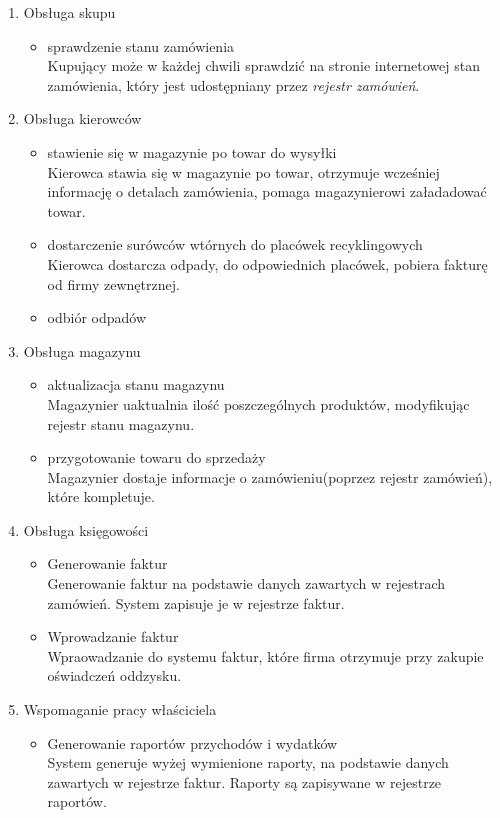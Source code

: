 \begin{enumerate}
	\item Obsługa skupu
		\begin{itemize}
			\item sprawdzenie stanu zamówienia \\ 
			Kupujący może w każdej chwili sprawdzić na stronie internetowej stan zamówienia, który jest udostępniany przez \emph{rejestr zamówień}.
		\end{itemize}
	\item Obsługa kierowców 
		\begin{itemize}
		\item stawienie się w magazynie po towar do wysyłki \\ 
		Kierowca stawia się w magazynie po towar, otrzymuje wcześniej informację o detalach zamówienia, pomaga magazynierowi załadadować towar.
		\item dostarczenie surówców wtórnych do placówek recyklingowych \\ 
		Kierowca dostarcza odpady, do odpowiednich placówek, pobiera fakturę od firmy zewnętrznej.
		\item odbiór odpadów
		\end{itemize}
	\item Obsługa magazynu
		\begin{itemize}
		\item aktualizacja stanu magazynu \\
	 	Magazynier uaktualnia ilość poszczególnych produktów, modyfikując rejestr stanu magazynu.
	 	\item przygotowanie towaru do sprzedaży \\
	 	Magazynier dostaje informacje o zamówieniu(poprzez rejestr zamówień), które kompletuje.
		\end{itemize}
	\item Obsługa księgowości
		\begin{itemize}
		\item Generowanie faktur \\ 
		Generowanie faktur na podstawie danych zawartych w rejestrach zamówień. System zapisuje je w rejestrze faktur.
		\item Wprowadzanie faktur \\
		Wpraowadzanie do systemu faktur, które firma otrzymuje przy zakupie oświadczeń oddzysku.
		\end{itemize}
	\item Wspomaganie pracy właściciela
		\begin{itemize}
		\item Generowanie raportów przychodów i wydatków\\
		System generuje wyżej wymienione raporty, na podstawie danych zawartych w rejestrze faktur. Raporty są zapisywane w rejestrze raportów.
		\end{itemize}

\end{enumerate}